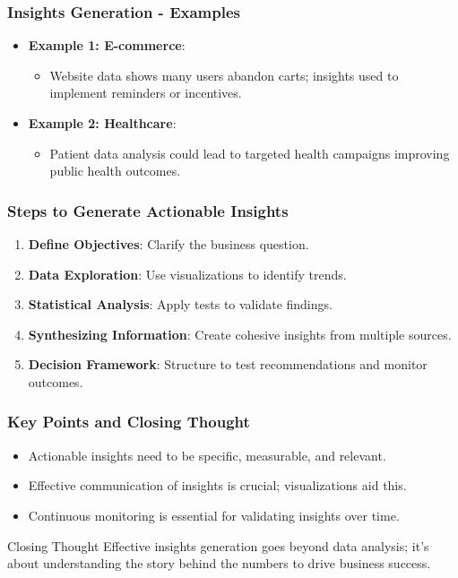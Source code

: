 \documentclass[aspectratio=169]{beamer}
\begin{document}
\begin{frame}[fragile]
    \frametitle{Insights Generation - Examples}
    \begin{itemize}
        \item \textbf{Example 1: E-commerce}:
            \begin{itemize}
                \item Website data shows many users abandon carts; insights used to implement reminders or incentives.
            \end{itemize}
        
        \item \textbf{Example 2: Healthcare}:
            \begin{itemize}
                \item Patient data analysis could lead to targeted health campaigns improving public health outcomes.
            \end{itemize}
    \end{itemize}
\end{frame}

\begin{frame}[fragile]
    \frametitle{Steps to Generate Actionable Insights}
    \begin{enumerate}
        \item \textbf{Define Objectives}: Clarify the business question.
        \item \textbf{Data Exploration}: Use visualizations to identify trends.
        \item \textbf{Statistical Analysis}: Apply tests to validate findings.
        \item \textbf{Synthesizing Information}: Create cohesive insights from multiple sources.
        \item \textbf{Decision Framework}: Structure to test recommendations and monitor outcomes.
    \end{enumerate}
\end{frame}

\begin{frame}[fragile]
    \frametitle{Key Points and Closing Thought}
    \begin{itemize}
        \item Actionable insights need to be specific, measurable, and relevant.
        \item Effective communication of insights is crucial; visualizations aid this.
        \item Continuous monitoring is essential for validating insights over time.
    \end{itemize}
    
    \begin{block}{Closing Thought}
        Effective insights generation goes beyond data analysis; it's about understanding the story behind the numbers to drive business success.
    \end{block}
\end{frame}
\end{document}
